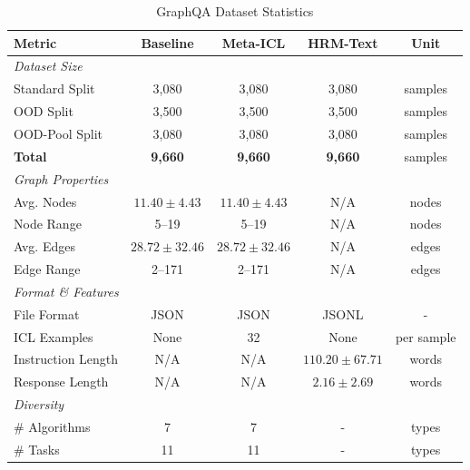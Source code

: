\begin{table}[h]
\centering
\small
\caption{GraphQA Dataset Statistics}
\label{tab:graphqa_dataset_stats}
\begin{tabular}{lcccc}
\toprule
\textbf{Metric} & \textbf{Baseline} & \textbf{Meta-ICL} & \textbf{HRM-Text} & \textbf{Unit} \\
\midrule
\multicolumn{5}{l}{\textit{Dataset Size}} \\
Standard Split & 3,080 & 3,080 & 3,080 & samples \\
OOD Split & 3,500 & 3,500 & 3,500 & samples \\
OOD-Pool Split & 3,080 & 3,080 & 3,080 & samples \\
\textbf{Total} & \textbf{9,660} & \textbf{9,660} & \textbf{9,660} & samples \\
\midrule
\multicolumn{5}{l}{\textit{Graph Properties}} \\
Avg. Nodes & $11.40 \pm 4.43$ & $11.40 \pm 4.43$ & N/A & nodes \\
Node Range & 5--19 & 5--19 & N/A & nodes \\
Avg. Edges & $28.72 \pm 32.46$ & $28.72 \pm 32.46$ & N/A & edges \\
Edge Range & 2--171 & 2--171 & N/A & edges \\
\midrule
\multicolumn{5}{l}{\textit{Format \& Features}} \\
File Format & JSON & JSON & JSONL & - \\
ICL Examples & None & 32 & None & per sample \\
Instruction Length & N/A & N/A & $110.20 \pm 67.71$ & words \\
Response Length & N/A & N/A & $2.16 \pm 2.69$ & words \\
\midrule
\multicolumn{5}{l}{\textit{Diversity}} \\
\# Algorithms & 7 & 7 & - & types \\
\# Tasks & 11 & 11 & - & types \\
\bottomrule
\end{tabular}
\end{table}